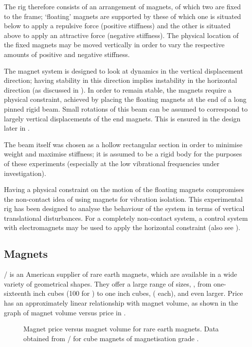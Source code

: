 The rig therefore consists of an arrangement of magnets, of which two are
fixed to the frame; `floating' magnets are supported by these of which one
is situated below to apply a repulsive force (positive stiffness) and the
other is situated above to apply an attractive force (negative stiffness). The
physical location of the fixed magnets may be moved vertically in order to
vary the respective amounts of positive and negative stiffness.

The magnet system is designed to look at dynamics in the vertical displacement
direction; having stability in this direction implies instability in the
horizontal direction (as discussed in ). In order to remain
stable, the magnets require a physical constraint, achieved by placing the
floating magnets at the end of a long pinned rigid beam. Small rotations of
this beam can be assumed to correspond to largely vertical displacements of
the end magnets. This is ensured in the design later in
.

The beam itself was chosen as a hollow rectangular section in order to
minimise weight and maximise stiffness; it is assumed to be a rigid body
for the purposes of these experiments (especially at the low vibrational
frequencies under investigation).

Having a physical constraint on the motion of the floating magnets compromises
the non-contact idea of using magnets for vibration isolation. This
experimental rig has been designed to analyse the behaviour of the system in
terms of vertical translational disturbances. For a completely non-contact
system, a control system with electromagnets may be used to apply the
horizontal constraint (also see ).

\subsection{Magnets}

\KJMagnetics/  is an American supplier
of rare earth magnets, which are available in a wide variety of geometrical
shapes. They offer a large range of sizes, \eg, from one-sixteenth inch cubes
(100 for ) to one inch cubes, (
each), and even larger.  Price has an
approximately linear relationship with magnet volume, as shown in the graph of
magnet volume versus price in .

\begin{figure}
  \caption{Magnet price versus magnet volume for rare earth magnets.
    Data obtained from \KJMagnetics/ for cube magnets of magnetisation grade .}
\end{figure}

